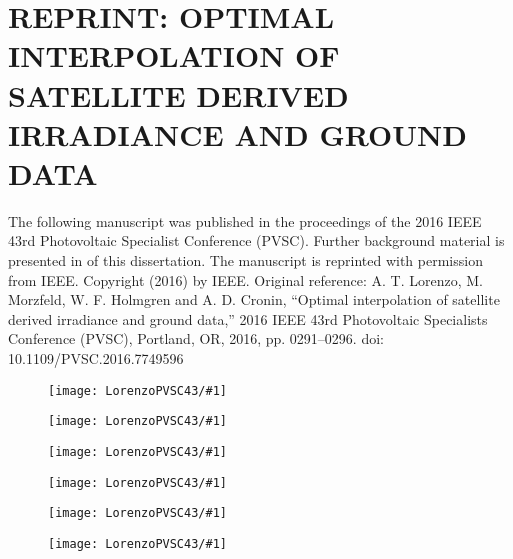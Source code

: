 \chapter{REPRINT: OPTIMAL INTERPOLATION OF SATELLITE DERIVED
  IRRADIANCE AND GROUND DATA}
\label{app:pvsc43}
The following manuscript was published in the proceedings of the 2016
IEEE 43rd Photovoltaic Specialist Conference (PVSC).
Further background material is presented in  of
this dissertation.
The manuscript is reprinted with permission from IEEE.
Copyright (2016) by IEEE.
Original reference:
A. T. Lorenzo, M. Morzfeld, W. F. Holmgren and A. D. Cronin, ``Optimal
interpolation of satellite derived irradiance and ground data,'' 2016
IEEE 43rd Photovoltaic Specialists Conference (PVSC), Portland, OR,
2016, pp. 0291--0296. doi: 10.1109/PVSC.2016.7749596


\renewcommand{\figPV}[1]{
\begin{figure}
\texttt{[image: LorenzoPVSC43/\#1]}
\end{figure}
}


\figPV{pg1}
\figPV{pg2}
\figPV{pg3}
\figPV{pg4}
\figPV{pg5}
\figPV{pg6}


